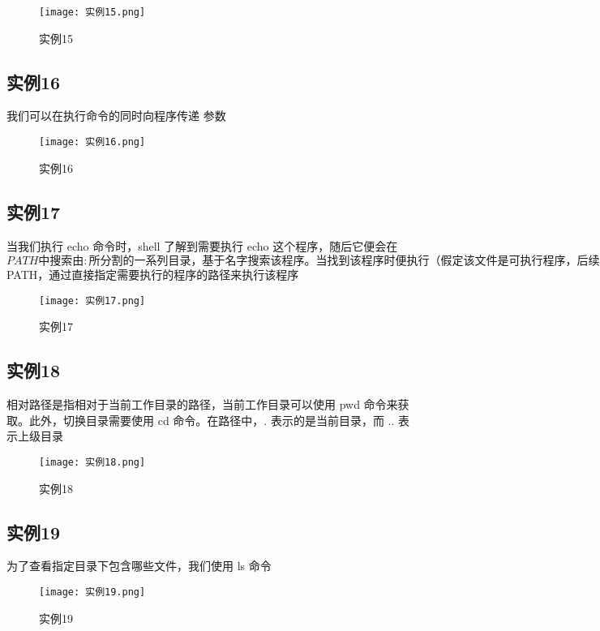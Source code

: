 \documentclass[a4paper, 12pt]{article}
\begin{document}
\begin{figure}[h!]
  \centering
  \texttt{[image: 实例15.png]}
  \caption{实例15}
\end{figure}

\subsection{实例16}
我们可以在执行命令的同时向程序传递 参数

\begin{figure}[h!]
  \centering
  \texttt{[image: 实例16.png]}
  \caption{实例16}
\end{figure}

\subsection{实例17}
当我们执行 echo 命令时，shell 了解到需要执行 echo 这个程序，随后它便会在 $PATH 中搜索由 : 所分割的一系列目录，基于名字搜索该程序。当找到该程序时便执行（假定该文件是 可执行程序，后续课程将详细讲解）。确定某个程序名代表的是哪个具体的程序，可以使用 which 程序。我们也可以绕过 $PATH，通过直接指定需要执行的程序的路径来执行该程序

\begin{figure}[h!]
  \centering
  \texttt{[image: 实例17.png]}
  \caption{实例17}
\end{figure}

\subsection{实例18}
相对路径是指相对于当前工作目录的路径，当前工作目录可以使用 pwd 命令来获取。此外，切换目录需要使用 cd 命令。在路径中，. 表示的是当前目录，而 .. 表示上级目录

\begin{figure}[h!]
  \centering
  \texttt{[image: 实例18.png]}
  \caption{实例18}
\end{figure}

\subsection{实例19}
为了查看指定目录下包含哪些文件，我们使用 ls 命令

\begin{figure}[h!]
  \centering
  \texttt{[image: 实例19.png]}
  \caption{实例19}
\end{figure}
\end{document}
